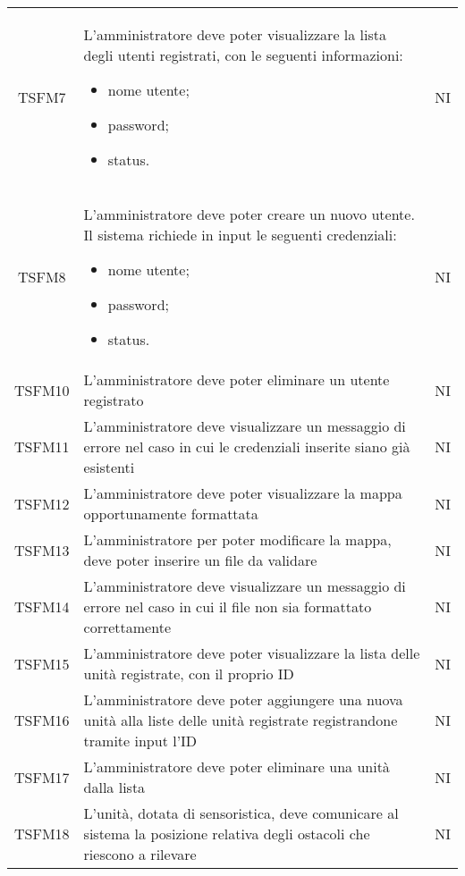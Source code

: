 \begin{longtable}[h!] { c  m{12cm} c}
		TSFM7 & L'amministratore deve poter visualizzare la lista degli utenti registrati, con le seguenti informazioni:
					\begin{itemize}
						\item nome utente;
						\item password;
						\item status.
					\end{itemize}
									& NI \\
		TSFM8 & L'amministratore deve poter creare un nuovo utente. Il sistema richiede in input le seguenti credenziali:
					\begin{itemize}
						\item nome utente;
						\item password;
						\item status.
					\end{itemize}
										& NI \\

		TSFM10 & L'amministratore deve poter eliminare un utente registrato & NI \\

		TSFM11 & L'amministratore deve visualizzare un messaggio di errore nel caso in cui le credenziali inserite siano già esistenti & NI \\
		
		TSFM12   & L'amministratore deve poter visualizzare la mappa opportunamente formattata & NI\\

		TSFM13   & L'amministratore per poter modificare la mappa, deve poter inserire un file da validare & NI\\

		TSFM14 & L'amministratore deve visualizzare un messaggio di errore nel caso in cui il file non sia formattato correttamente & NI \\

		TSFM15   & L'amministratore deve poter visualizzare la lista delle unità registrate, con il proprio ID & NI\\

		TSFM16 & L'amministratore deve poter aggiungere una nuova unità alla liste delle unità registrate registrandone tramite input l'ID & NI\\

		TSFM17 & L'amministratore deve poter eliminare una unità dalla lista & NI\\

		TSFM18   & L'unità, dotata di sensoristica, deve comunicare al sistema la posizione relativa degli ostacoli che riescono a rilevare & NI \\


\end{longtable}

